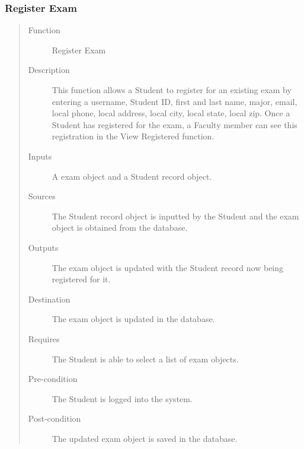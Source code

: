 \subsubsection{Register Exam} 
\begin{quote} %
\begin{description}
\item[Function]
   Register Exam
\item[Description]
   This function allows a Student to register for an existing exam by entering a
   username, Student ID, first and last name, major, email, local phone, local
   address, local city, local state, local zip.  Once a Student has registered
   for the exam, a Faculty member can see this registration in the View
   Registered function.
\item[Inputs]
   A exam object and a Student record object.
\item[Sources]
   The Student record object is inputted by the Student and the exam object is
   obtained from the database.
\item[Outputs]
   The exam object is updated with the Student record now being registered for
   it.
\item[Destination]
   The exam object is updated in the database.
\item[Requires]
   The Student is able to select a list of exam objects.
\item[Pre-condition]
   The Student is logged into the system.
\item[Post-condition]
   The updated exam object is saved in the database.
\end{description}
\end{quote} %

